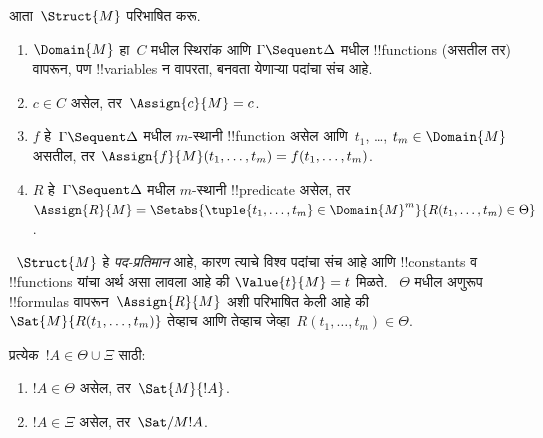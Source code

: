 \documentclass[../../../include/open-logic-section]{subfiles}
\begin{document}
आता~$\Struct{M}$ परिभाषित करू.
\begin{enumerate}
\item $\Domain{M}$ हा~$C$ मधील स्थिरांक आणि
$\Gamma \Sequent \Delta$ मधील !!{function}s
(असतील तर) वापरून, पण !!{variable}s न वापरता,
बनवता येणाऱ्या पदांचा संच आहे.
\item $c \in C$ असेल, तर~$\Assign{c}{M} = c$.
\item $f$ हे~$\Gamma \Sequent \Delta$ मधील
$m$-स्थानी !!{function} असेल आणि~$t_1$,
\dots, $t_m \in \Domain{M}$ असतील, तर
$\Assign{f}{M}(t_1, \dots, t_m) = f(t_1, \dots, t_m)$.
\item $R$ हे~$\Gamma \Sequent \Delta$ मधील
$m$-स्थानी !!{predicate} असेल, तर
$\Assign{R}{M} = \Setabs{\tuple{t_1, \dots, t_m} \in
\Domain{M}^m}{R(t_1, \dots, t_m) \in \Theta}$.
\end{enumerate}
~$\Struct{M}$ हे \emph{पद-प्रतिमान} आहे, कारण
त्याचे विश्व पदांचा संच आहे आणि !!{constant}s व
!!{function}s यांचा अर्थ असा लावला आहे की
$\Value{t}{M} = t$ मिळते. ~$\Theta$ मधील अणुरूप
!!{formula}s वापरून~$\Assign{R}{M}$ अशी परिभाषित
केली आहे की~$\Sat{M}{R(t_1, \dots, t_m)}$ तेव्हाच
आणि तेव्हाच जेव्हा~$R(t_1, \dots, t_m) \in \Theta$.

\begin{lem}
प्रत्येक~$!A \in \Theta \cup \Xi$ साठी:
\begin{enumerate}
  \item $!A \in \Theta$ असेल, तर~$\Sat{M}{!A}$.
  \item $!A \in \Xi$ असेल, तर~$\Sat/{M}{!A}$.
\end{enumerate}
\end{lem}
\end{document}
